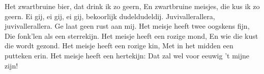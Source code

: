 \beginverse
Het zwartbruine bier, dat drink ik zo geern,
En zwartbruine meisjes, die kus ik zo geern.
Ei gij, ei gij, ei gij, bekoorlijk dudeldudeldij.
Juvivallerallera, juvivallerallera.
Ge laat geen rust aan mij.
\endverse
\beginverse
Het meisje heeft twee oogskens fijn,
Die fonk’len als een sterrekijn.
\endverse
\beginverse
Het meisje heeft een rozige mond,
En wie die kust die wordt gezond.
\endverse
\beginverse
Het meisje heeft een rozige kin,
Met in het midden een putteken erin.
\endverse
\beginverse
Het meisje heeft een hertekijn:
Dat zal wel voor eeuwig 't mijne zijn!
\endverse
\endsong